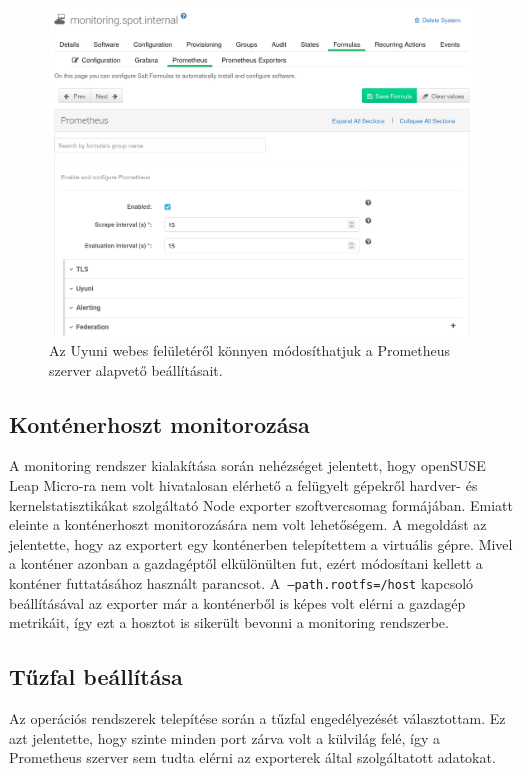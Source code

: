 \begin{figure}[ht]
	\centering
	\includegraphics[width=15cm]{figures/prometheus-formula.png}
	\caption{Az Uyuni webes felületéről könnyen módosíthatjuk a Prometheus szerver alapvető beállításait.}
	\label{fig:prometheus-formula}
\end{figure}

\subsection{Konténerhoszt monitorozása}
A monitoring rendszer kialakítása során nehézséget jelentett, hogy openSUSE Leap Micro-ra nem volt hivatalosan elérhető a felügyelt gépekről hardver- és kernelstatisztikákat szolgáltató Node exporter szoftvercsomag formájában. Emiatt eleinte a konténerhoszt monitorozására nem volt lehetőségem. A megoldást az jelentette, hogy az exportert egy konténerben telepítettem a virtuális gépre. Mivel a konténer azonban a gazdagéptől elkülönülten fut, ezért módosítani kellett a konténer futtatásához használt parancsot. A~\texttt{--path.rootfs=/host} kapcsoló beállításával az exporter már a konténerből is képes volt elérni a gazdagép metrikáit, így ezt a hosztot is sikerült bevonni a monitoring rendszerbe.

\subsection{Tűzfal beállítása}
Az operációs rendszerek telepítése során a tűzfal engedélyezését választottam. Ez azt jelentette, hogy szinte minden port zárva volt a külvilág felé, így a Prometheus szerver sem tudta elérni az exporterek által szolgáltatott adatokat.

